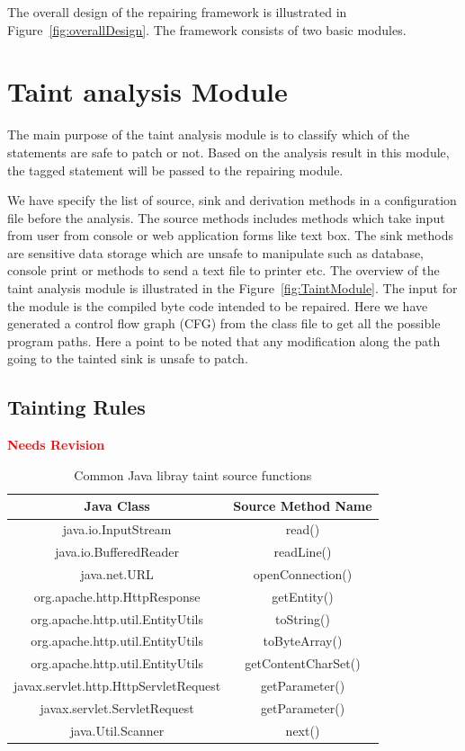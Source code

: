 The overall design of the repairing framework is illustrated in
Figure~\ref{fig:overallDesign}. The framework consists of two basic modules.


\section{Taint analysis Module}
\label{subsec:TaintModule}

The main purpose of the taint analysis module is to classify which of the
statements are safe to patch or not. Based on the analysis result in this
module, the tagged statement will be passed to the repairing module.


We have specify the list of source, sink and derivation methods in a
configuration file before the analysis. The source methods includes methods which
take input from user from console or web application forms like text box. The
sink methods are sensitive data storage which are unsafe to manipulate such as
database, console print or methods to send a text file to printer etc. The
overview of the taint analysis module is illustrated in the
Figure~\ref{fig:TaintModule}.  The input for the module is the compiled byte
code intended to be repaired. Here we have generated a control flow graph (CFG)
from the class file to get all the possible program paths. Here a point to be
noted that any modification along the path going to the tainted sink is unsafe
to patch.


\subsection{Tainting Rules}
\label{subsubsec:TaintingRule}
\textcolor{red}{\textbf{Needs Revision}}\newline

\begin{table}[!htb]
\centering
\caption{Common Java libray taint source functions}
\label{tab:TaintSources}
\begin{tabular}{|c|c|}
\hline

 \textbf{Java Class} & \textbf{Source Method Name}\\
 \hline java.io.InputStream & read()\\ \hline
 java.io.BufferedReader & readLine()\\ \hline
 java.net.URL & openConnection()\\ \hline
 org.apache.http.HttpResponse & getEntity()\\ \hline
 org.apache.http.util.EntityUtils & toString()\\ \hline
 org.apache.http.util.EntityUtils & toByteArray()\\ \hline 
 org.apache.http.util.EntityUtils & getContentCharSet()\\ \hline 
 javax.servlet.http.HttpServletRequest & getParameter()\\ \hline
 javax.servlet.ServletRequest & getParameter()\\ \hline
 java.Util.Scanner & next()\\ \hline

\end{tabular}
\end{table}



